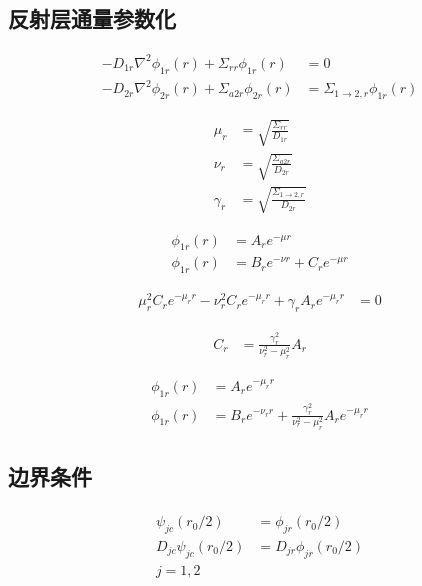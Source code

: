 \subsection{反射层通量参数化}

\begin{align}
    -D_{1r}\nabla^2\phi_{1r}(r) + \Sigma_{rr}\phi_{1r}(r) &= 0 \\
    -D_{2r}\nabla^2\phi_{2r}(r) + \Sigma_{a2r}\phi_{2r}(r) &= \Sigma_{1\rightarrow 2,r}\phi_{1r}(r)
\end{align}

\begin{align}
    \mu_r &= \sqrt{\frac{\Sigma_{rr}}{D_{1r}}} \\
    \nu_r &= \sqrt{\frac{\Sigma_{a2r}}{D_{2r}}} \\
    \gamma_r &= \sqrt{\frac{\Sigma_{1\rightarrow 2,r}}{D_{2r}}}
\end{align}

\begin{align}
    \phi_{1r}(r) &= A_r e^{-\mu r} \\
    \phi_{1r}(r) &= B_r e^{-\nu r} + C_r e^{-\mu r}
\end{align}

\begin{align}
    \mu_r^2 C_r e^{-\mu_r r} - \nu_r^2 C_r e^{-\mu_r r} + \gamma_r A_r e^{-\mu_r r} &= 0
\end{align}

\begin{align}
    C_r &= \frac{\gamma_r^2}{\nu_r^2 - \mu_r^2}A_r
\end{align}

\begin{align}
    \phi_{1r}(r) &= A_r e^{-\mu_r r} \\
    \phi_{1r}(r) &= B_r e^{-\nu_r r} + \frac{\gamma_r^2}{\nu_r^2 - \mu_r^2}A_r e^{-\mu_r r}
\end{align}

\subsection{边界条件}

\begin{align}
    \begin{split}
        \psi_{jc}(r_0 / 2) &= \phi_{jr}(r_0 / 2) \\
        D_{jc}\psi_{jc}(r_0 / 2) &= D_{jr}\phi_{jr}(r_0 / 2) \\
        j = 1,2
    \end{split}
\end{align}

